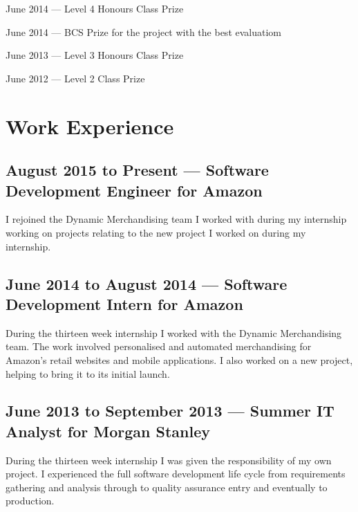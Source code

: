 \documentclass[11pt,a4paper]{article}
\begin{document}
June 2014 --- Level 4 Honours Class Prize

June 2014 --- BCS Prize for the project with the best evaluatiom

June 2013 --- Level 3 Honours Class Prize

June 2012 --- Level 2 Class Prize

\section*{Work Experience}

\subsection*{August 2015 to Present --- Software Development Engineer for Amazon}

I rejoined the Dynamic Merchandising team I worked with during my internship
working on projects relating to the new project I worked on during my
internship.

\subsection*{June 2014 to August 2014 --- Software Development Intern for Amazon}

During the thirteen week internship I worked with the Dynamic Merchandising
team. The work involved personalised and automated merchandising for Amazon's
retail websites and mobile applications. I also worked on a new project, helping
to bring it to its initial launch.

\subsection*{June 2013 to September 2013 --- Summer IT Analyst for Morgan Stanley}

During the thirteen week internship I was given the responsibility of my own
project. I experienced the full software development life cycle from
requirements gathering and analysis through to quality assurance entry and
eventually to production.

\end{document}

